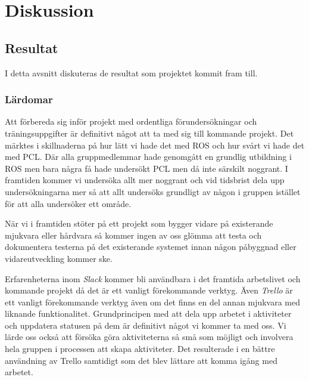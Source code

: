 \chapter{Diskussion}
\label{cha:discussion}

\section{Resultat}
\label{sec:discussion-results}


I detta avsnitt diskuteras de resultat som projektet kommit fram till.

\subsection{Lärdomar}

Att förbereda sig inför projekt med ordentliga förundersökningar och träningsuppgifter är definitivt något att ta med sig till kommande projekt. Det märktes i skillnaderna på hur lätt vi hade det med ROS och hur svårt vi hade det med PCL. Där alla gruppmedlemmar hade genomgått en grundlig utbildning i ROS men bara några få hade undersökt PCL men då inte särskilt noggrant. I framtiden kommer vi undersöka allt mer noggrant och vid tidsbrist dela upp undersökningarna mer så att allt undersöks grundligt av någon i gruppen istället för att alla undersöker ett område.

När vi i framtiden stöter på ett projekt som bygger vidare på existerande mjukvara eller hårdvara så kommer ingen av oss glömma att testa och dokumentera testerna på det existerande systemet innan någon påbyggnad eller vidareutveckling kommer ske.

Erfarenheterna inom \textit{Slack} kommer bli användbara i det framtida arbetslivet och kommande projekt då det är ett vanligt förekommande verktyg. Även \textit{Trello} är ett vanligt förekommande verktyg även om det finns en del annan mjukvara med liknande funktionalitet. Grundprincipen med att dela upp arbetet i aktiviteter och uppdatera statusen på dem är definitivt något vi kommer ta med oss. Vi lärde oss också att försöka göra aktiviteterna så små som möjligt och involvera hela gruppen i processen att skapa aktiviteter. Det resulterade i en bättre användning av Trello samtidigt som det blev lättare att komma igång med arbetet.

